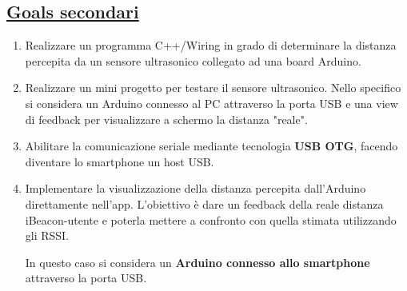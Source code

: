 \subsection{\underline{Goals secondari}}
\begin{enumerate}	
	\item Realizzare un programma C++/Wiring in grado di determinare la distanza percepita da un sensore ultrasonico collegato ad una board Arduino.
	
	\item Realizzare un mini progetto per testare il sensore ultrasonico. Nello specifico si considera un Arduino connesso al PC attraverso la porta USB e una view di feedback per visualizzare a schermo la distanza "reale".
	
	\item Abilitare la comunicazione seriale mediante tecnologia \textbf{USB OTG}, facendo diventare lo smartphone un host USB.
	
	\item Implementare la visualizzazione della distanza percepita dall'Arduino direttamente nell'app. L'obiettivo è dare un feedback della reale distanza iBeacon-utente e poterla mettere a confronto con quella stimata utilizzando gli RSSI. 
	
	In questo caso si considera un \textbf{Arduino connesso allo smartphone} attraverso la porta USB.
\end{enumerate}



